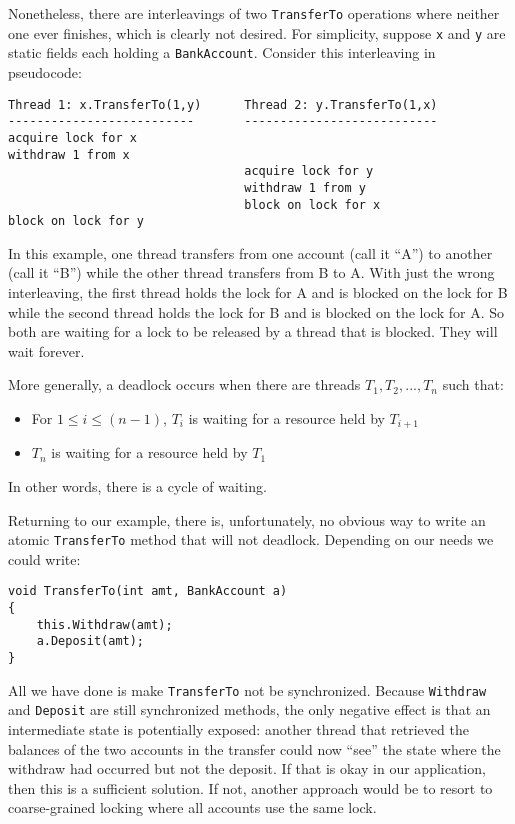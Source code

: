 \documentclass[10pt]{article}
\begin{document}
Nonetheless, there are interleavings of two {\tt TransferTo}
operations where neither one ever finishes, which is clearly not
desired.  For simplicity, suppose {\tt x} and {\tt y} are static
fields each holding a {\tt BankAccount}.  Consider this interleaving
in pseudocode:

\begin{verbatim}
Thread 1: x.TransferTo(1,y)      Thread 2: y.TransferTo(1,x)
--------------------------       ---------------------------
acquire lock for x     
withdraw 1 from x
                                 acquire lock for y
                                 withdraw 1 from y
                                 block on lock for x
block on lock for y
\end{verbatim}

In this example, one thread transfers from one account (call it ``A'')
to another (call it ``B'') while the other thread transfers from B to
A.  With just the wrong interleaving, the first thread holds the lock
for A and is blocked on the lock for B while the second thread holds
the lock for B and is blocked on the lock for A.  So both are waiting
for a lock to be released by a thread that is blocked.  They will wait
forever.

More generally, a deadlock occurs when there are threads $T_1, T_2,
..., T_n$ such that:
\begin{itemize}
\item For $1\leq i\leq (n-1)$, $T_i$ is waiting for a resource held by
  $T_{i+1}$ 
\item $T_n$ is waiting for a resource held by $T_1$
\end{itemize}
In other words, there is a cycle of waiting.  

Returning to our example, there is, unfortunately, no obvious way to
write an atomic {\tt TransferTo} method that will not deadlock.
Depending on our needs we could write:
\begin{verbatim}
void TransferTo(int amt, BankAccount a)
{
    this.Withdraw(amt);
    a.Deposit(amt);
}
\end{verbatim}
All we have done is make {\tt TransferTo} not be synchronized.
Because {\tt Withdraw} and {\tt Deposit} are still synchronized
methods, the only negative effect is that an intermediate state is
potentially exposed:  another thread that retrieved the balances of
the two accounts in the transfer could now ``see'' the state where the
withdraw had occurred but not the deposit.  If that is okay in our
application, then this is a sufficient solution.  If not, another
approach would be to resort to coarse-grained locking where all
accounts use the same lock.  
\end{document}
